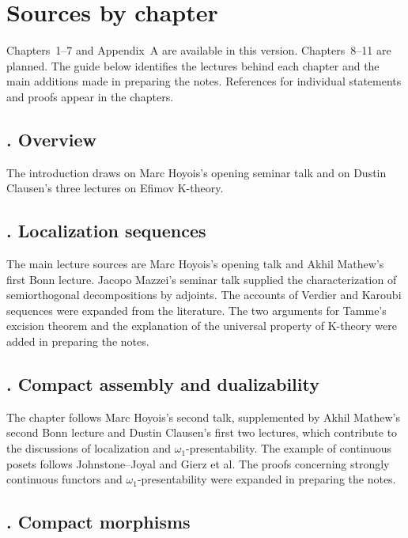 \documentclass[11pt]{book}
\begin{document}
	\section*{Sources by chapter}

	Chapters~1--7 and Appendix~A are available in this version. Chapters~8--11 are planned. The guide below identifies the lectures behind each chapter and the main additions made in preparing the notes. References for individual statements and proofs appear in the chapters.

	\subsection*{. Overview}

	The introduction draws on Marc Hoyois's opening seminar talk and on Dustin Clausen's three lectures on Efimov K-theory.

	\subsection*{. Localization sequences}

	The main lecture sources are Marc Hoyois's opening talk and Akhil Mathew's first Bonn lecture. Jacopo Mazzei's seminar talk supplied the characterization of semiorthogonal decompositions by adjoints. The accounts of Verdier and Karoubi sequences were expanded from the literature. The two arguments for Tamme's excision theorem and the explanation of the universal property of K-theory were added in preparing the notes.

	\subsection*{. Compact assembly and dualizability}

	The chapter follows Marc Hoyois's second talk, supplemented by Akhil Mathew's second Bonn lecture and Dustin Clausen's first two lectures, which contribute to the discussions of localization and $\omega_1$-presentability. The example of continuous posets follows Johnstone--Joyal and Gierz et al. The proofs concerning strongly continuous functors and $\omega_1$-presentability were expanded in preparing the notes.

	\subsection*{. Compact morphisms}
\end{document}
